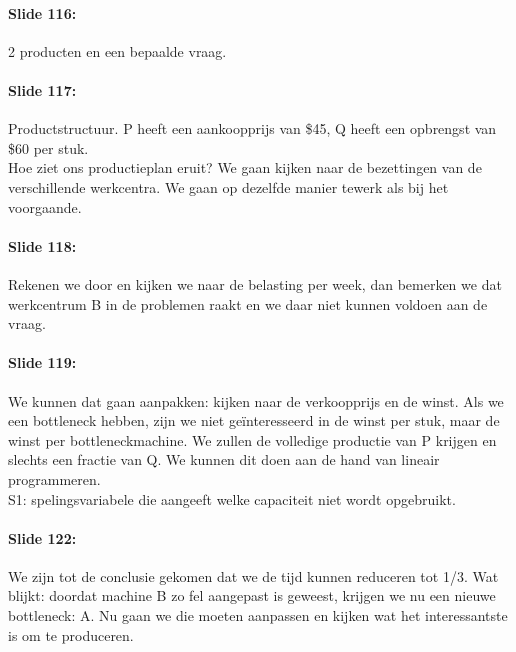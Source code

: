 \documentclass[10pt,a4paper]{report}
\begin{document}
\paragraph{Slide 116:} 2 producten en een bepaalde vraag.

\paragraph{Slide 117:} Productstructuur. P heeft een aankoopprijs van \$45, Q heeft een opbrengst van \$60 per stuk.\\
Hoe ziet ons productieplan eruit? We gaan kijken naar de bezettingen van de verschillende werkcentra. We gaan op dezelfde manier tewerk als bij het voorgaande. 

\paragraph{Slide 118:} Rekenen we door en kijken we naar de belasting per week, dan bemerken we dat werkcentrum B in de problemen raakt en we daar niet kunnen voldoen aan de vraag.

\paragraph{Slide 119:} We kunnen dat gaan aanpakken: kijken naar de verkoopprijs en de winst. Als we een bottleneck hebben, zijn we niet ge\"interesseerd in de winst per stuk, maar de winst per bottleneckmachine. We zullen de volledige productie van P krijgen en slechts een fractie van Q.
We kunnen dit doen aan de hand van lineair programmeren.\\
S1: spelingsvariabele die aangeeft welke capaciteit niet wordt opgebruikt. 

\paragraph{Slide 122:} We zijn tot de conclusie gekomen dat we de tijd kunnen reduceren tot 1/3. Wat blijkt: doordat machine B zo fel aangepast is geweest, krijgen we nu een nieuwe bottleneck: A. Nu gaan we die moeten aanpassen en kijken wat het interessantste is om te produceren.
\end{document}
